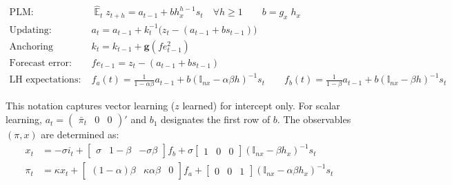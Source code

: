 \documentclass[11pt]{article}
\renewcommand{\[}{\begin{equation}}
\renewcommand{\]}{\end{equation}}
\DeclareMathOperator{\E}{\mathbb{E}}
\begin{document}
\begin{align}
\text{PLM:} \quad \quad & \hat{\E}_t z_{t+h}  =  a_{t-1} + bh_x^{h-1}s_t  \quad \forall h\geq 1 \quad \quad b = g_x\; h_x \quad \quad  \label{PLM} \\
\text{Updating:} \quad \quad & a_{t}  =a_{t-1} +k_t^{-1}\big(z_{t} -(a_{t-1}+b s_{t-1}) \big)  \\
\text{Anchoring function:} \quad \quad & k_t  = k_{t-1} + \mathbf{g}(fe_{t-1}^2) \\
\text{Forecast error:} \quad \quad & fe_{t-1}  = z_t - (a_{t-1}+b s_{t-1})\\
\text{LH expectations:} \quad \quad & f_a(t) = \frac{1}{1-\alpha\beta}a_{t-1}  + b(\mathbb{I}_{nx} - \alpha\beta h)^{-1}s_t \quad \quad  f_b(t) = \frac{1}{1-\beta}a_{t-1}  + b(\mathbb{I}_{nx} - \beta h)^{-1}s_t  \label{fafb_anal}
\end{align}

\vspace{-0.5cm}

This notation captures vector learning ($z$ learned) for intercept only. For scalar learning, $a_t= \begin{pmatrix} \bar{\pi}_t & 0 & 0\end{pmatrix}' $ and $b_1$ designates the first row of $b$. The observables $(\pi, x)$ are determined as:
\begin{align}
x_t &=  -\sigma i_t + \begin{bmatrix} \sigma & 1-\beta & -\sigma\beta \end{bmatrix} f_b + \sigma \begin{bmatrix} 1 & 0 & 0 \end{bmatrix} (\mathbb{I}_{nx} - \beta h_x)^{-1} s_t \label{A9} \\
\pi_t &= \kappa x_t  + \begin{bmatrix} (1-\alpha)\beta & \kappa\alpha\beta & 0 \end{bmatrix}  f_a + \begin{bmatrix} 0 & 0 & 1 \end{bmatrix}  (\mathbb{I}_{nx} - \alpha \beta h_x)^{-1}  s_t \label{A10}
\end{align}
\end{document}
